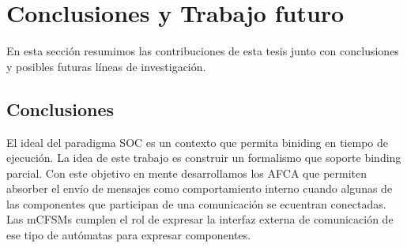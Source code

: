 \newpage
\chapter{Conclusiones y Trabajo futuro} 
\label{conclusiones}

En esta sección resumimos las contribuciones de esta tesis junto con conclusiones y posibles futuras líneas de investigación.


\section{Conclusiones}
El ideal del paradigma SOC es un contexto que permita biniding en tiempo de ejecución. La idea de este trabajo es construir un formalismo que soporte binding parcial. Con este objetivo en mente desarrollamos los AFCA que permiten absorber el envío de mensajes como comportamiento interno cuando algunas de las componentes que participan de una comunicación se ecuentran conectadas. Las mCFSMs cumplen el rol de expresar la interfaz externa de comunicación de ese tipo de autómatas para expresar componentes.



